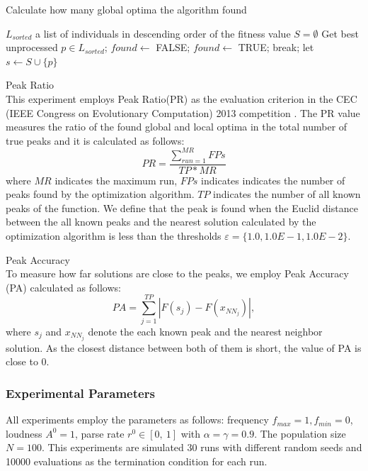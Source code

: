 \documentclass[conference]{IEEEtran}
\begin{document}
\begin{algorithm}[H]
\caption{Calculate how many global optima the algorithm found}
\label{code:foptima}
\begin{algorithmic}[2]
\REQUIRE $L_{sorted}$ a list of individuals in descending order of the fitness value
\STATE $S = \emptyset$
\STATE Get best unprocessed $p \in L_{sorted}$;
\STATE $found \leftarrow$ FALSE;
\STATE $found \leftarrow$ TRUE;
\STATE break;
\ENDIF
\ENDFOR
{}
\STATE let $s \leftarrow S \cup \{p\}$
\ENDIF
\ENDIF
\ENDWHILE
\end{algorithmic}
\end{algorithm}

\begin{description}
\item Peak Ratio\\
This experiment employs Peak Ratio(PR) \cite{CDE} as the evaluation criterion in the CEC (IEEE Congress on Evolutionary Computation) 2013 competition \cite{cec2013}. The PR value measures the ratio of the found global and local optima in the total number of true peaks and it is calculated as follows: 
\begin{equation}
\label{eq:PR}
PR=\frac{\sum_{run=1}^{MR}FPs}{TP*MR}
\end{equation}
 where ${MR}$ indicates the maximum run, ${FPs}$ indicates indicates the number of peaks found by the optimization algorithm. ${TP}$ indicates the number of all known peaks of the function. We define that the peak is found when the Euclid distance between the all known peaks and the nearest solution calculated by the optimization algorithm is less than the thresholds $\varepsilon = \{1.0, 1.0E-1, 1.0E-2\}$.

\item Peak Accuracy\\
To measure how far solutions are close to the peaks, we employ Peak Accuracy (PA) \cite{CDE} calculated as follows:
\begin{equation}
PA=\sum_{j=1}^{TP}|F(s_j)-F(x_{NN_j})|,
\end{equation}
where $s_j$ and $x_{NN_j}$ denote the each known peak and the nearest neighbor solution. As the closest distance between both of them is short, the value of PA is close to 0.  
\end{description}

 \subsubsection{Experimental Parameters}
All experiments employ the parameters as follows: frequency ${f_{max}=1, f_{min}=0}$, loudness ${A^0}=1$, parse rate ${r^0} \in [0, \ 1]$ with ${\alpha =\gamma = 0.9}$. The population size ${N=100}$. This experiments are simulated 30 runs with different random seeds and 10000 evaluations as the termination condition for each run.
\end{document}
